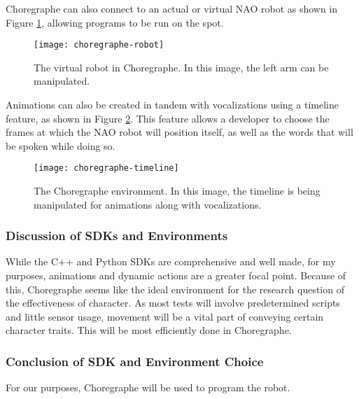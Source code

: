 Choregraphe can also connect to an actual or virtual NAO robot as shown in Figure \ref{fig:choregraphe-robot}, allowing programs to be run on the spot.

\begin{figure}[H]
	\centering
	\texttt{[image: choregraphe-robot]}
	\caption{The virtual robot in Choregraphe. In this image, the left arm can be manipulated.}
	\label{fig:choregraphe-robot}
\end{figure}

Animations can also be created in tandem with vocalizations using a timeline feature, as shown in Figure \ref{fig:choregraphe-timeline}. This feature allows a developer to choose the frames at which the NAO robot will position itself, as well as the words that will be spoken while doing so. \cite{NAOSDK:Choregraphe}

\begin{figure}[H]
	\centering
	\texttt{[image: choregraphe-timeline]}
	\caption{The Choregraphe environment. In this image, the timeline is being manipulated for animations along with vocalizations.}
	\label{fig:choregraphe-timeline}
\end{figure}

\subsubsection{Discussion of SDKs and Environments}
While the C++ and Python SDKs are comprehensive and well made, for my purposes, animations and dynamic actions are a greater focal point.
Because of this, Choregraphe seems like the ideal environment for the research question of the effectiveness of character.
As most tests will involve predetermined scripts and little sensor usage, movement will be a vital part of conveying certain character traits. This will be most efficiently done in Choregraphe.

\subsubsection{Conclusion of SDK and Environment Choice}
For our purposes, Choregraphe will be used to program the robot.
